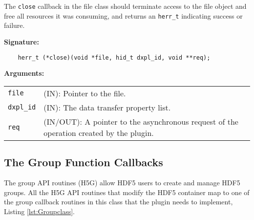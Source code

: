 %
%
%

The \texttt{close} callback in the file class should terminate access to
the file object and free all resources it was consuming, and returns
an \texttt{herr\_t} indicating success or failure.\bigskip\bigskip

\begin{mdframed}[style=bgbox]
\textbf{Signature:}
\begin{lstlisting}
    herr_t (*close)(void *file, hid_t dxpl_id, void **req);
\end{lstlisting}

\textbf{Arguments:}\\
\begin{tabular}{l p{10cm}}
  \texttt{file} & (IN): Pointer to the file.\\
  \texttt{dxpl\_id} & (IN): The data transfer property list.\\
  \texttt{req} & (IN/OUT): A pointer to the asynchronous request of the
  operation created by the plugin.\\
\end{tabular}
\end{mdframed}

\subsection{The Group Function Callbacks}
The group API routines (H5G) allow HDF5 users to create and manage
HDF5 groups. All the H5G API routines that modify the HDF5 container
map to one of the group callback routines in this class that the
plugin needs to implement, Listing \ref{lst:Groupclass}.

